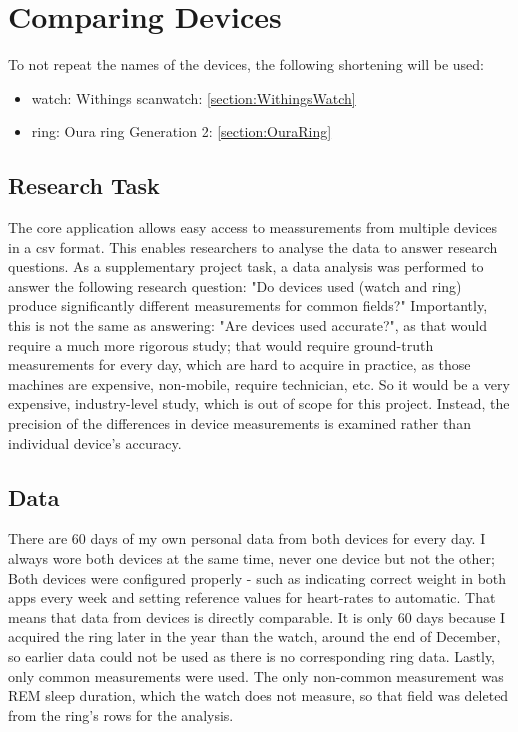 \chapter{Comparing Devices}
To not repeat the names of the devices, the following shortening will be used: 
\begin{itemize}
    \item watch: Withings scanwatch: \ref{section:WithingsWatch}
    \item ring: Oura ring Generation 2: \ref{section:OuraRing}
\end{itemize}
\section{Research Task}
The core application allows easy access to meassurements from multiple devices in a csv format. This enables researchers to analyse the data to answer research questions. As a supplementary project task, a data analysis was performed to answer the following research question: "Do devices used (watch and ring) produce significantly different measurements for common fields?" Importantly, this is not the same as answering: "Are devices used accurate?", as that would require a much more rigorous study; that would require ground-truth measurements for every day, which are hard to acquire in practice, as those machines are expensive, non-mobile, require technician, etc. So it would be a very expensive, industry-level study, which is out of scope for this project. Instead, the precision of the differences in device measurements is examined rather than individual device's accuracy. 
\section{Data}
There are 60 days of my own personal data from both devices for every day. I always wore both devices at the same time, never one device but not the other; Both devices were configured properly - such as indicating correct weight in both apps every week and setting reference values for heart-rates to automatic. That means that data from devices is directly comparable. It is only 60 days because I acquired the ring later in the year than the watch, around the end of December, so earlier data could not be used as there is no corresponding ring data. Lastly, only common measurements were used. The only non-common measurement was REM sleep duration, which the watch does not measure, so that field was deleted from the ring's rows for the analysis.
